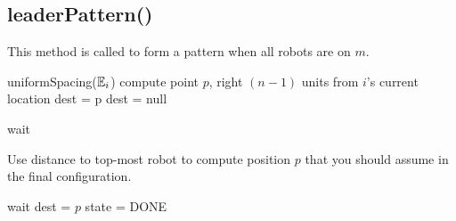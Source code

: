 \documentclass[preprint,10pt]{elsarticle}
\begin{document}
\subsection{leaderPattern()} 
	This method is called to form a pattern when all robots are on $m$.
\begin{algorithm}[H]
\begin{algorithmic}[1]
	uniformSpacing($\mathbb{E}_i$) %
		\State compute point $p$, right $(n-1)$ units from $i$'s current location
		\State dest = p
	\Else
		dest = null
	\EndIf

		\State wait
	\EndWhile

	\State Use distance to top-most robot to compute position $p$ that you
	should assume in the final configuration.

		\State wait
	\EndWhile
	\State dest = $p$
	\State state = DONE


\EndProcedure
\end{algorithmic}
\end{algorithm}

 

\end{document}
